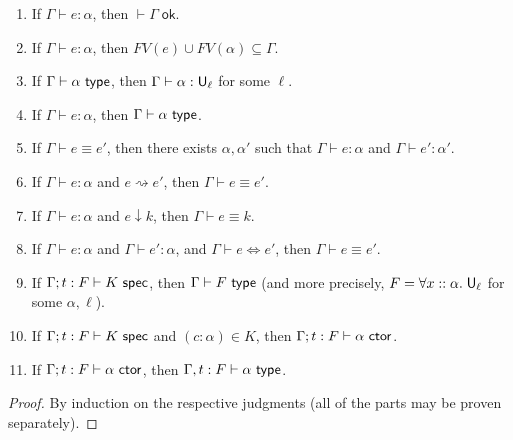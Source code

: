 \begin{lemma}[Regularity]\label{reg}
\begin{enumerate}
\item If $\Gamma\vdash e:\alpha$, then $\vdash\Gamma\;\mathsf{ok}$.
\item If $\Gamma\vdash e:\alpha$, then $FV(e)\cup FV(\alpha)\subseteq\Gamma$.
\item If $\Gamma\vdash\alpha\type$, then $\Gamma\vdash\alpha:\U_\ell$ for some $\ell$.
\item If $\Gamma\vdash e:\alpha$, then $\Gamma\vdash\alpha\type$.
\item\label{defeq_reg2} If $\Gamma\vdash e\equiv e'$, then there exists $\alpha,\alpha'$ such that $\Gamma\vdash e:\alpha$ and $\Gamma\vdash e':\alpha'$.
\item If $\Gamma\vdash e:\alpha$ and $e\rightsquigarrow e'$, then $\Gamma\vdash e\equiv e'$.
\item If $\Gamma\vdash e:\alpha$ and $e\downarrow k$, then $\Gamma\vdash e\equiv k$.
\item\label{alg_defn} If $\Gamma\vdash e:\alpha$ and $\Gamma\vdash e':\alpha$, and $\Gamma\vdash e\Leftrightarrow e'$, then $\Gamma\vdash e\equiv e'$.
\item If $\Gamma;t:F\vdash K\spec$, then $\Gamma\vdash F\type$ (and more precisely, $F=\forall x::\alpha.\;\mathsf{U}_\ell$ for some $\alpha,\ell$).
\item If $\Gamma;t:F\vdash K\spec$ and $(c:\alpha)\in K$, then $\Gamma;t:F\vdash\alpha\ctor$.
\item If $\Gamma;t:F\vdash \alpha\ctor$, then $\Gamma,t:F\vdash\alpha\type$.
\end{enumerate}
\end{lemma}
\begin{proof}
By induction on the respective judgments (all of the parts may be proven separately).
\end{proof}

